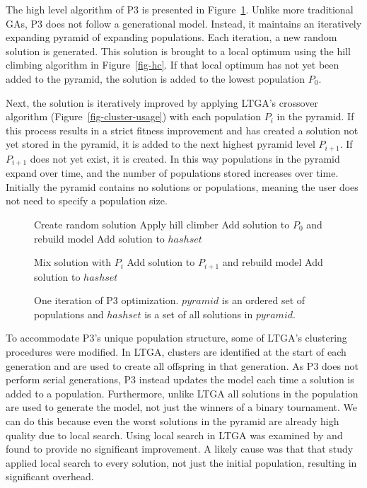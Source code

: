 \documentclass[twoside]{article}
\begin{document}
The high level algorithm of P3 is presented in Figure~\ref{fig-p3}. Unlike more traditional
GAs, P3 does not follow a generational model. Instead, it maintains an iteratively
expanding pyramid of expanding populations. Each iteration, a new random solution is generated.
This solution is brought to a local optimum using the hill climbing algorithm in Figure~\ref{fig-hc}. If that
local optimum has not yet been added to the pyramid, the solution is added to the lowest
population $P_0$.

Next, the solution is iteratively improved by applying LTGA's crossover algorithm (Figure~\ref{fig-cluster-usage})
with each population $P_i$ in the pyramid. If this process results in a strict fitness improvement and has
created a solution not yet stored in the pyramid, it is added to the next highest pyramid level $P_{i+1}$.
If $P_{i+1}$ does not yet exist, it is created. In this way populations in the pyramid expand over time,
and the number of populations stored increases over time. Initially the pyramid contains no solutions
or populations, meaning the user does not need to specify a population size.


\begin{figure}
  \begin{algorithmic}[1]
    \State Create random solution
    \State Apply hill climber
      \State Add solution to $P_0$ and rebuild model
      \State Add solution to $hashset$
    \EndIf

      \State Mix solution with $P_i$
          \State Add solution to $P_{i+1}$ and rebuild model
          \State Add solution to $hashset$
        \EndIf
      \EndIf
    \EndFor
  \EndProcedure
\end{algorithmic}
  \caption{One iteration of P3 optimization. $pyramid$ is an
           ordered set of populations and $hashset$ is a set
           of all solutions in $pyramid$.}
  \label{fig-p3}
\end{figure}

To accommodate P3's unique population structure, some of LTGA's clustering procedures were modified. In LTGA,
clusters are identified at the start of each generation and are used
to create all offspring in that generation. As P3 does not perform serial
generations, P3 instead updates the model each
time a solution is added to a population. Furthermore, unlike
LTGA all solutions in the population are used to generate the model, not just the
winners of a binary tournament. We can do this because even the
worst solutions in the pyramid are already high quality due to local search.
Using local search in LTGA was examined by \cite{bosman:2011:lsbbo} and found
to provide no significant improvement. A likely cause was that that study applied
local search to every solution, not just the initial population, resulting in significant overhead.
\end{document}
